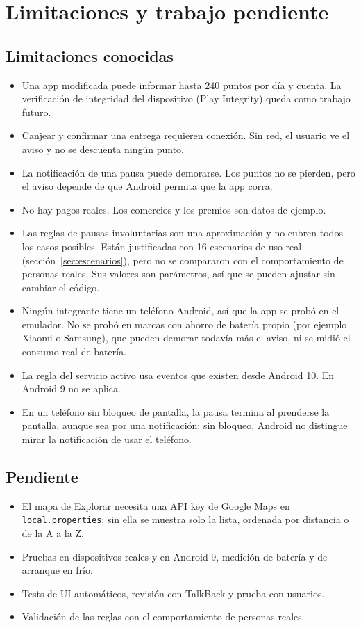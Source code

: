 \section{Limitaciones y trabajo pendiente}

\subsection{Limitaciones conocidas}

\begin{itemize}
\item Una app modificada puede informar hasta 240 puntos por día y cuenta. La verificación de integridad
del dispositivo (Play Integrity) queda como trabajo futuro.
\item Canjear y confirmar una entrega requieren conexión. Sin red, el usuario ve el aviso y no se
descuenta ningún punto.
\item La notificación de una pausa puede demorarse. Los puntos no se pierden, pero el aviso depende de que
Android permita que la app corra.
\item No hay pagos reales. Los comercios y los premios son datos de ejemplo.
\item Las reglas de pausas involuntarias son una aproximación y no cubren todos los casos posibles.
Están justificadas con 16 escenarios de uso real (sección~\ref{sec:escenarios}), pero no se compararon
con el comportamiento de personas reales. Sus valores son parámetros, así que se pueden ajustar sin
cambiar el código.
\item Ningún integrante tiene un teléfono Android, así que la app se probó en el emulador. No se probó
en marcas con ahorro de batería propio (por ejemplo Xiaomi o Samsung), que pueden demorar todavía más
el aviso, ni se midió el consumo real de batería.
\item La regla del servicio activo usa eventos que existen desde Android 10. En Android 9 no se aplica.
\item En un teléfono sin bloqueo de pantalla, la pausa termina al prenderse la pantalla, aunque sea por una
notificación: sin bloqueo, Android no distingue mirar la notificación de usar el teléfono.
\end{itemize}

\subsection{Pendiente}

\begin{itemize}
\item El mapa de Explorar necesita una API key de Google Maps en \texttt{local.properties}; sin ella se
muestra solo la lista, ordenada por distancia o de la A a la Z.
\item Pruebas en dispositivos reales y en Android 9, medición de batería y de arranque en frío.
\item Tests de UI automáticos, revisión con TalkBack y prueba con usuarios.
\item Validación de las reglas con el comportamiento de personas reales.
\end{itemize}
